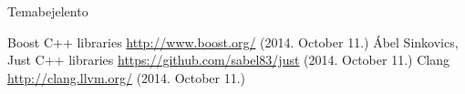 \documentclass[a4paper,12pt]{report}
\begin{document}




\vspace*{\fill}
\begin{center}
Temabejelento
\end{center}
\vfill
\thispagestyle{empty}
\newpage
\setcounter{page}{1}

\tableofcontents









\begin{thebibliography}{9}
    Boost C++ libraries
    \url{http://www.boost.org/} (2014. October 11.)
    Ábel Sinkovics, Just C++ libraries
    \url{https://github.com/sabel83/just} (2014. October 11.)
    Clang
    \url{http://clang.llvm.org/} (2014. October 11.)
\end{thebibliography}
\end{document}
